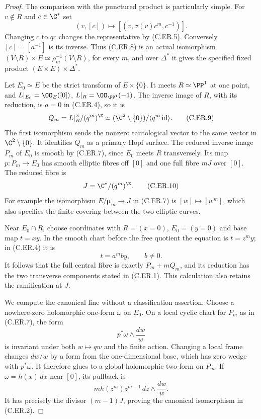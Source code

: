 \begin{proof}
The comparison with the punctured product is particularly simple.
For $v\notin R$ and $c\in\C^*$ set
\[
       (v,[c])\longmapsto[(v,\sigma(v)c^m,c^{-1})].
                                                        \tag{C.ER.8}
\]
Changing $c$ to $qc$ changes the representative by (C.ER.5).
Conversely $[c]=[a^{-1}]$ is its inverse. Thus (C.ER.8) is an
actual isomorphism $(V\setminus R)\times E\simeq
\rho_m^{-1}(V\setminus R)$, for every $m$, and over $\Delta^*$
it gives the specified fixed product $(E\times E)\times\Delta^*$.

Let $E_0\simeq E$ be the strict transform of $E\times\{0\}$.
It meets $R\simeq\PP^1$ at one point, and
$L|_{E_0}=\OO_E([0])$, $L|_R=\OO_{\PP^1}(-1)$.
The inverse image of $R$, with its reduction, is $a=0$ in
(C.ER.4), so it is
\[
 Q_m=L|_R^\times/(q^m)^{\Z}
     \simeq(\C^2\setminus\{0\})/\langle q^m\operatorname{id}\rangle.
                                                        \tag{C.ER.9}
\]
The first isomorphism sends the nonzero tautological vector to
the same vector in $\C^2\setminus\{0\}$. It identifies $Q_m$
as a primary Hopf surface. The reduced inverse image $P_m$ of
$E_0$ is smooth by (C.ER.7), since $E_0$ meets $R$ transversely.
Its map $p:P_m\to E_0$ has smooth elliptic fibres off $[0]$ and
one full fibre $mJ$ over $[0]$. The reduced fibre is
\[
                    J=\C^*/(q^m)^{\Z}.
                                                        \tag{C.ER.10}
\]
For example the isomorphism $E/\boldsymbol\mu_m\to J$ in
(C.ER.7) is $[w]\mapsto[w^m]$, which also specifies the finite
covering between the two elliptic curves.

Near $E_0\cap R$, choose coordinates with $R=(x=0)$,
$E_0=(y=0)$ and base map $t=xy$. In the smooth chart before
the free quotient the equation is $t=z^m y$; in (C.ER.4) it is
\[
                         t=a^m b y,\qquad b\ne0.
                                                        \tag{C.ER.11}
\]
It follows that the full central fibre is exactly $P_m+mQ_m$,
and its reduction has the two transverse components stated in
(C.ER.1). This calculation also retains the ramification at $J$.

We compute the canonical line without a classification assertion.
Choose a nowhere-zero holomorphic one-form $\omega$ on $E_0$.
On a local cyclic chart for $P_m$ as in (C.ER.7), the form
\[
                         p^*\omega\wedge\frac{dw}{w}
                                                        \tag{C.ER.12}
\]
is invariant under both $w\mapsto qw$ and the finite action.
Changing a local frame changes $dw/w$ by a form from the
one-dimensional base, which has zero wedge with $p^*\omega$.
It therefore glues to a global holomorphic two-form on $P_m$.
If $\omega=h(x)\,dx$ near $[0]$, its pullback is
\[
 m h(z^m)z^{m-1}\,dz\wedge\frac{dw}{w}.
                                                        \tag{C.ER.13}
\]
It has precisely the divisor $(m-1)J$, proving the canonical
isomorphism in (C.ER.2).


\end{proof}
